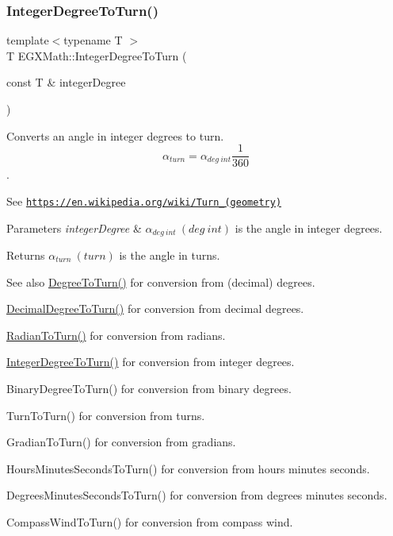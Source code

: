 \subsubsection{\texorpdfstring{Integer\+Degree\+To\+Turn()}{IntegerDegreeToTurn()}}
{\footnotesize\ttfamily template$<$typename T $>$ \\
T E\+G\+X\+Math\+::\+Integer\+Degree\+To\+Turn (\begin{DoxyParamCaption}\item[{const T \&}]{integer\+Degree }\end{DoxyParamCaption})}



Converts an angle in integer degrees to turn. \[\alpha_{turn}=\alpha_{deg\ int}\frac{1}{360}\]. 

See \href{https://en.wikipedia.org/wiki/Turn_(geometry)}{\tt https\+://en.\+wikipedia.\+org/wiki/\+Turn\+\_\+(geometry)} 
\begin{DoxyParams}{Parameters}
{\em integer\+Degree} & $\alpha_{deg\ int}\ (deg\ int)$ is the angle in integer degrees. \\
\hline
\end{DoxyParams}
\begin{DoxyReturn}{Returns}
$\alpha_{turn}\ (turn)$ is the angle in turns. 
\end{DoxyReturn}
\begin{DoxySeeAlso}{See also}
\mbox{\hyperlink{group___e_g_x_math-_angle_conversions-_degree_gafb4ce930493a7d6202ede3ee1630ef5d}{Degree\+To\+Turn()}} for conversion from (decimal) degrees. 

\mbox{\hyperlink{group___e_g_x_math-_angle_conversions-_decimal_degree_ga396a13c10acdef5026c12f3217b142c1}{Decimal\+Degree\+To\+Turn()}} for conversion from decimal degrees. 

\mbox{\hyperlink{group___e_g_x_math-_angle_conversions-_radian_ga8492d6d2f6467c619b65e5fb75a9ae04}{Radian\+To\+Turn()}} for conversion from radians. 

\mbox{\hyperlink{group___e_g_x_math-_angle_conversions-_integer_degree_ga06ddbdada5a3978105c855d4aae735ae}{Integer\+Degree\+To\+Turn()}} for conversion from integer degrees. 

Binary\+Degree\+To\+Turn() for conversion from binary degrees. 

Turn\+To\+Turn() for conversion from turns. 

Gradian\+To\+Turn() for conversion from gradians. 

Hours\+Minutes\+Seconds\+To\+Turn() for conversion from hours minutes seconds. 

Degrees\+Minutes\+Seconds\+To\+Turn() for conversion from degrees minutes seconds. 

Compass\+Wind\+To\+Turn() for conversion from compass wind. 
\end{DoxySeeAlso}
